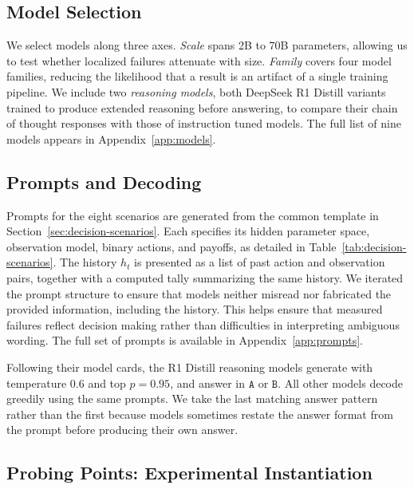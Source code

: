 \documentclass[letterpaper]{article} %
\begin{document}
\subsection{Model Selection}

We select models along three axes. \emph{Scale} spans 2B to 70B parameters,
allowing us to test whether localized failures attenuate with size.
\emph{Family} covers four model families, reducing the likelihood that a
result is an artifact of a single training pipeline. We include two
\emph{reasoning models}, both DeepSeek R1 Distill variants trained to
produce extended reasoning before answering, to compare their chain of
thought responses with those of instruction tuned models. 
The full list of nine models appears in Appendix~\ref{app:models}.

\subsection{Prompts and Decoding}

Prompts for the eight scenarios are generated from the common template in
Section~\ref{sec:decision-scenarios}. Each specifies its hidden parameter
space, observation model, binary actions, and payoffs, as detailed in
Table~\ref{tab:decision-scenarios}. The history \(h_t\) is presented as a
list of past action and observation pairs, together with a computed tally
summarizing the same history. We iterated the prompt structure to ensure
that models neither misread nor fabricated the provided information,
including the history. This helps ensure that measured failures reflect
decision making rather than difficulties in interpreting ambiguous
wording. The full set of prompts is available in
Appendix~\ref{app:prompts}.

Following their model cards, the R1 Distill reasoning models generate with
temperature \(0.6\) and top \(p=0.95\), and answer in
\(\boxed{\texttt{A}}\) or \(\boxed{\texttt{B}}\). All other models decode
greedily using the same prompts. We take the last matching answer pattern
rather than the first because models sometimes restate the answer format
from the prompt before producing their own answer.





\subsection{Probing Points: Experimental Instantiation}
\end{document}
